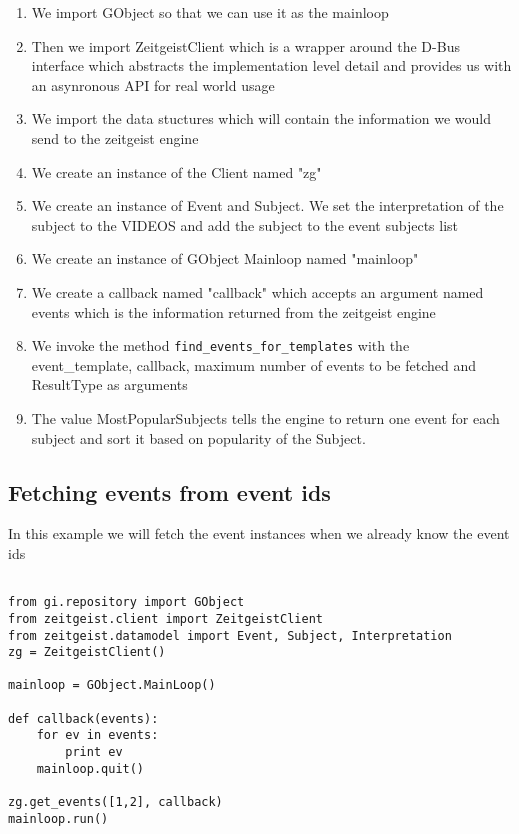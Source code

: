 \begin{enumerate}
\item We import GObject so that we can use it as the mainloop
\item Then we import ZeitgeistClient which is a wrapper around the D-Bus interface 
which abstracts the implementation level detail and provides us with an asynronous 
API for real world usage
\item We import the data stuctures which will contain the information we would 
send to the zeitgeist engine
\item We create an instance of the Client named "zg"
\item We create an instance of Event and Subject. We set the interpretation of the 
subject to the VIDEOS and add the subject to the event subjects list
\item We create an instance of GObject Mainloop named "mainloop"
\item We create a callback named "callback" which accepts an argument named events 
which is the information returned from the zeitgeist engine
\item We invoke the method \texttt{find\_events\_for\_templates} with the event\_template, 
callback, maximum number of events to be fetched and ResultType as arguments
\item The value MostPopularSubjects tells the engine to return one event for each 
subject and sort it based on popularity of the Subject.
\end{enumerate}

\subsection{Fetching events from event ids}

In this example we will fetch the event instances when we already know the event ids

\begin{center}
\begin{verbatim}

from gi.repository import GObject
from zeitgeist.client import ZeitgeistClient
from zeitgeist.datamodel import Event, Subject, Interpretation
zg = ZeitgeistClient()

mainloop = GObject.MainLoop()

def callback(events):
	for ev in events:
		print ev
	mainloop.quit()

zg.get_events([1,2], callback)
mainloop.run()

\end{verbatim}
\end{center}

